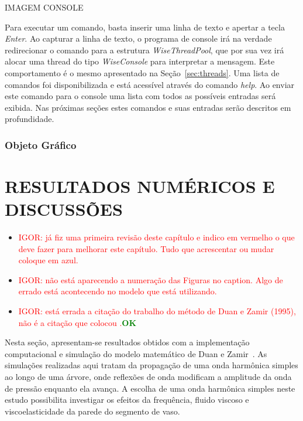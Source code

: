 \documentclass[a4paper,12pt]{monografia}
\theoremstyle{plain}
\theoremstyle{definition}
\theoremstyle{remark}
\begin{document}
IMAGEM CONSOLE

Para executar um comando, basta inserir uma linha de texto e apertar a tecla \textit{Enter}.  Ao capturar a linha de texto, o programa de console irá na verdade redirecionar o comando para a estrutura \textit{WiseThreadPool}, que por sua vez irá alocar uma thread do tipo \textit{WiseConsole} para interpretar a mensagem. Este comportamento é o mesmo apresentado na Seção~\ref{sec:threads}. Uma lista de comandos foi disponibilizada e está acessível através do comando \textit{help}. Ao enviar este comando para o console uma lista com todos as possíveis entradas será exibida. Nas próximas seções estes comandos e suas entradas serão descritos em profundidade.

\subsection{Objeto Gráfico}\label{sec:objeto_grafico}

\chapter{RESULTADOS NUMÉRICOS E DISCUSSÕES}

\begin{itemize}
	\item \textcolor{red}{IGOR: já fiz uma primeira revisão deste capítulo e indico em vermelho o que deve fazer para melhorar este capítulo. Tudo que acrescentar ou mudar coloque em azul.}
	\item \textcolor{red}{IGOR: não está aparecendo a numeração das Figuras no caption. Algo de errado está acontecendo no modelo que está utilizando.}
	\item \textcolor{red}{IGOR: está errada a citação do trabalho do método de Duan e Zamir (1995), não é a citação que colocou \cite{Duan}.}\textcolor{green}{\textbf{OK}}
\end{itemize}

Nesta seção, apresentam-se resultados obtidos com a implementação computacional e simulação do modelo matemático de Duan e Zamir~\cite{Duan1992}. As simulações realizadas aqui tratam da propagação de uma onda harmônica simples ao longo de uma árvore, onde reflexões de onda modificam a amplitude da onda de pressão enquanto ela avança. A escolha de uma onda harmônica simples neste estudo possibilita investigar os efeitos da frequência, fluido viscoso e viscoelasticidade da parede do segmento de vaso.
\end{document}
